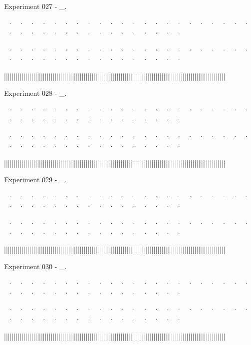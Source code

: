 Experiment 027 - _. 


~· ~· ~· ~· ~· ~· ~· ~· ~· ~· ~· ~· ~· ~· ~· ~· ~· ~· ~· ~· ~· ~· ~· ~· ~· ~· ~· ~· ~· ~· ~· ~· ~· ~· ~· ~· ~· ~· 

~· ~· ~· ~· ~· ~· ~· ~· ~· ~· ~· ~· ~· ~· ~· ~· ~· ~· ~· ~· ~· ~· ~· ~· ~· ~· ~· ~· ~· ~· ~· ~· ~· ~· ~· ~· ~· ~· 



||||||||||||||||||||||||||||||||||||||||||||||||||||||||||||||||||||||||||||||||||||||||||||||||||||||||||||||||||


Experiment 028 - _. 


~· ~· ~· ~· ~· ~· ~· ~· ~· ~· ~· ~· ~· ~· ~· ~· ~· ~· ~· ~· ~· ~· ~· ~· ~· ~· ~· ~· ~· ~· ~· ~· ~· ~· ~· ~· ~· ~· 

~· ~· ~· ~· ~· ~· ~· ~· ~· ~· ~· ~· ~· ~· ~· ~· ~· ~· ~· ~· ~· ~· ~· ~· ~· ~· ~· ~· ~· ~· ~· ~· ~· ~· ~· ~· ~· ~· 



||||||||||||||||||||||||||||||||||||||||||||||||||||||||||||||||||||||||||||||||||||||||||||||||||||||||||||||||||


Experiment 029 - _. 


~· ~· ~· ~· ~· ~· ~· ~· ~· ~· ~· ~· ~· ~· ~· ~· ~· ~· ~· ~· ~· ~· ~· ~· ~· ~· ~· ~· ~· ~· ~· ~· ~· ~· ~· ~· ~· ~· 

~· ~· ~· ~· ~· ~· ~· ~· ~· ~· ~· ~· ~· ~· ~· ~· ~· ~· ~· ~· ~· ~· ~· ~· ~· ~· ~· ~· ~· ~· ~· ~· ~· ~· ~· ~· ~· ~· 



||||||||||||||||||||||||||||||||||||||||||||||||||||||||||||||||||||||||||||||||||||||||||||||||||||||||||||||||||


Experiment 030 - _. 


~· ~· ~· ~· ~· ~· ~· ~· ~· ~· ~· ~· ~· ~· ~· ~· ~· ~· ~· ~· ~· ~· ~· ~· ~· ~· ~· ~· ~· ~· ~· ~· ~· ~· ~· ~· ~· ~· 

~· ~· ~· ~· ~· ~· ~· ~· ~· ~· ~· ~· ~· ~· ~· ~· ~· ~· ~· ~· ~· ~· ~· ~· ~· ~· ~· ~· ~· ~· ~· ~· ~· ~· ~· ~· ~· ~· 



||||||||||||||||||||||||||||||||||||||||||||||||||||||||||||||||||||||||||||||||||||||||||||||||||||||||||||||||||








